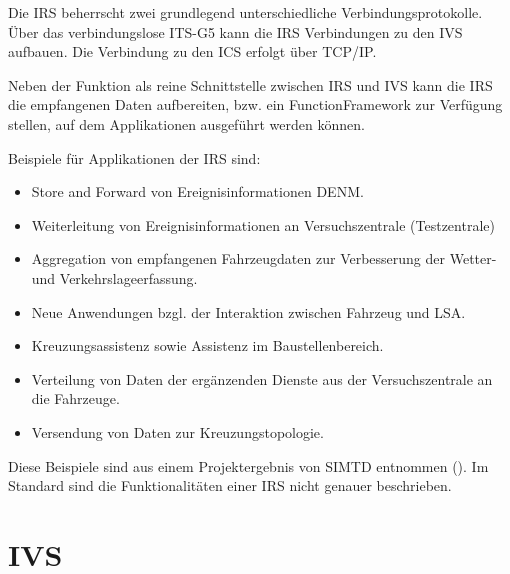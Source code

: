 Die \ac{IRS} beherrscht zwei grundlegend unterschiedliche Verbindungsprotokolle. Über das verbindungslose ITS-G5 kann die \ac{IRS} Verbindungen zu den \ac{IVS} aufbauen. Die Verbindung zu den \ac{ICS} erfolgt über TCP/IP. 

Neben der Funktion als reine Schnittstelle zwischen \ac{IRS} und \ac{IVS} kann die \ac{IRS} die empfangenen Daten aufbereiten, bzw. ein FunctionFramework zur Verfügung stellen, auf dem Applikationen ausgeführt werden können.


Beispiele für Applikationen der \ac{IRS} sind:
\begin{itemize}
	\item Store and Forward von Ereignisinformationen \ac{DENM}.
	\item Weiterleitung von Ereignisinformationen an Versuchszentrale (Testzentrale)
	\item Aggregation von empfangenen Fahrzeugdaten zur Verbesserung der Wetter- und Verkehrslageerfassung. 
	\item Neue Anwendungen bzgl. der Interaktion zwischen Fahrzeug und LSA.
	\item  Kreuzungsassistenz sowie Assistenz im Baustellenbereich.
	\item Verteilung von Daten der ergänzenden Dienste aus der Versuchszentrale an die Fahrzeuge.
	\item Versendung von Daten zur Kreuzungstopologie.
\end{itemize}

Diese Beispiele sind aus einem Projektergebnis von \ac{SIMTD} entnommen (\cite{simtd-D12.1}). Im Standard sind die Funktionalitäten einer \ac{IRS} nicht genauer beschrieben. 




\section{IVS}


